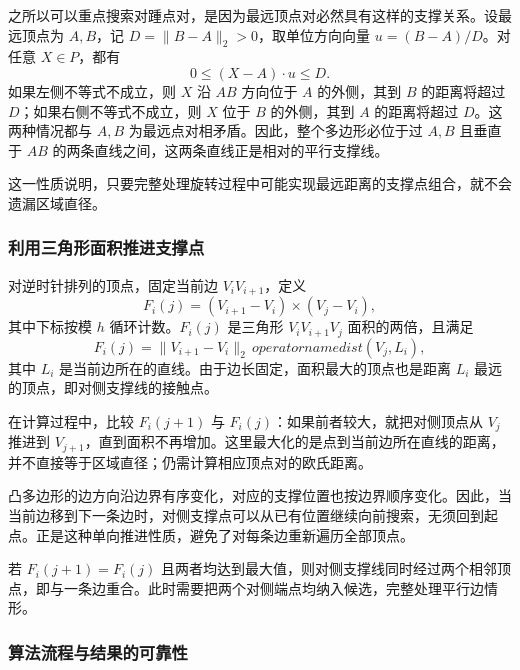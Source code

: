 之所以可以重点搜索对踵点对，是因为最远顶点对必然具有这样的支撑关系。设最远顶点为 $A,B$，记 $D=\|B-A\|_2>0$，取单位方向向量 $u=(B-A)/D$。对任意 $X\in P$，都有
\begin{equation}\label{eq:p1-support}
    0\le(X-A)\cdot u\le D.
\end{equation}
如果左侧不等式不成立，则 $X$ 沿 $AB$ 方向位于 $A$ 的外侧，其到 $B$ 的距离将超过 $D$；如果右侧不等式不成立，则 $X$ 位于 $B$ 的外侧，其到 $A$ 的距离将超过 $D$。这两种情况都与 $A,B$ 为最远点对相矛盾。因此，整个多边形必位于过 $A,B$ 且垂直于 $AB$ 的两条直线之间，这两条直线正是相对的平行支撑线。

这一性质说明，只要完整处理旋转过程中可能实现最远距离的支撑点组合，就不会遗漏区域直径。

\subsubsection{利用三角形面积推进支撑点}

对逆时针排列的顶点，固定当前边 $V_iV_{i+1}$，定义
\begin{equation}\label{eq:p1-area}
    F_i(j)=(V_{i+1}-V_i)\times(V_j-V_i),
\end{equation}
其中下标按模 $h$ 循环计数。$F_i(j)$ 是三角形 $V_iV_{i+1}V_j$ 面积的两倍，且满足
\begin{equation}
    F_i(j)=\|V_{i+1}-V_i\|_2\,operatorname{dist}(V_j,L_i),
\end{equation}
其中 $L_i$ 是当前边所在的直线。由于边长固定，面积最大的顶点也是距离 $L_i$ 最远的顶点，即对侧支撑线的接触点。

在计算过程中，比较 $F_i(j+1)$ 与 $F_i(j)$：如果前者较大，就把对侧顶点从 $V_j$ 推进到 $V_{j+1}$，直到面积不再增加。这里最大化的是点到当前边所在直线的距离，并不直接等于区域直径；仍需计算相应顶点对的欧氏距离。

凸多边形的边方向沿边界有序变化，对应的支撑位置也按边界顺序变化。因此，当当前边移到下一条边时，对侧支撑点可以从已有位置继续向前搜索，无须回到起点。正是这种单向推进性质，避免了对每条边重新遍历全部顶点。

若 $F_i(j+1)=F_i(j)$ 且两者均达到最大值，则对侧支撑线同时经过两个相邻顶点，即与一条边重合。此时需要把两个对侧端点均纳入候选，完整处理平行边情形。

\subsubsection{算法流程与结果的可靠性}

